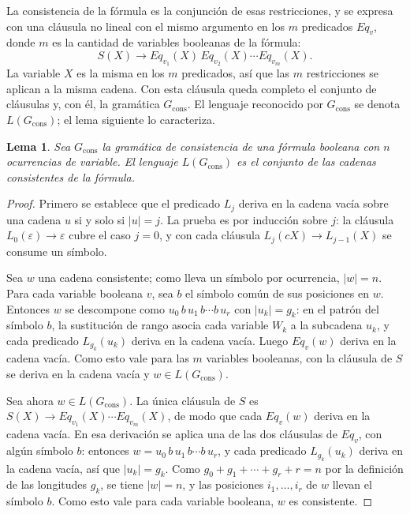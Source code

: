 \documentclass{report}
\theoremstyle{definition}
\theoremstyle{plain}
\newtheorem{lema}{Lema}[chapter]
\theoremstyle{remark}
\begin{document}
La consistencia
de la fórmula es la conjunción de esas restricciones, y se expresa con
una cláusula no lineal con el mismo argumento en los $m$ predicados
$Eq_v$, donde $m$ es la cantidad de variables booleanas de la fórmula:
\[
  S(X) \to Eq_{v_1}(X)\, Eq_{v_2}(X) \cdots Eq_{v_m}(X).
\]
La variable $X$ es la misma en los $m$ predicados, así que las $m$
restricciones se aplican a la misma cadena. Con esta cláusula queda
completo el conjunto de cláusulas y, con él, la gramática
$G_{\mathrm{cons}}$. El lenguaje reconocido por $G_{\mathrm{cons}}$ se
denota $L(G_{\mathrm{cons}})$; el lema siguiente lo caracteriza.

\begin{lema}
  \label{lema:lenguaje-gcons}
  Sea $G_{\mathrm{cons}}$ la gramática de consistencia de una fórmula
  booleana con $n$ ocurrencias de variable. El lenguaje
  $L(G_{\mathrm{cons}})$ es el conjunto de las cadenas consistentes de
  la fórmula.
\end{lema}

\begin{proof}
  Primero se establece que el predicado $L_j$ deriva en la cadena vacía
  sobre una cadena $u$ si y solo si $|u| = j$. La prueba es por
  inducción sobre $j$: la cláusula $L_0(\varepsilon) \to \varepsilon$
  cubre el caso $j = 0$, y con cada cláusula $L_j(cX) \to L_{j-1}(X)$
  se consume un símbolo.

  Sea $w$ una cadena consistente; como lleva un símbolo por ocurrencia,
  $|w| = n$. Para cada variable booleana $v$, sea $b$ el símbolo común
  de sus posiciones en $w$. Entonces $w$ se descompone como
  $u_0\, b\, u_1\, b \cdots b\, u_r$ con $|u_k| = g_k$: en el patrón
  del símbolo $b$, la sustitución de rango asocia cada variable $W_k$ a
  la subcadena $u_k$, y cada predicado $L_{g_k}(u_k)$ deriva en la
  cadena vacía. Luego $Eq_v(w)$ deriva en la cadena vacía. Como esto
  vale para las $m$ variables booleanas, con la cláusula de $S$ se
  deriva en la cadena vacía y $w \in L(G_{\mathrm{cons}})$.

  Sea ahora $w \in L(G_{\mathrm{cons}})$. La única cláusula de $S$ es
  $S(X) \to Eq_{v_1}(X) \cdots Eq_{v_m}(X)$, de modo que cada $Eq_v(w)$
  deriva en la cadena vacía. En esa derivación se aplica una de las dos
  cláusulas de $Eq_v$, con algún símbolo $b$: entonces
  $w = u_0\, b\, u_1\, b \cdots b\, u_r$, y cada predicado
  $L_{g_k}(u_k)$ deriva en la cadena vacía, así que $|u_k| = g_k$. Como
  $g_0 + g_1 + \cdots + g_r + r = n$ por la definición de las
  longitudes $g_k$, se tiene $|w| = n$, y las posiciones
  $i_1, \ldots, i_r$ de $w$ llevan el símbolo $b$. Como esto vale para
  cada variable booleana, $w$ es consistente.
\end{proof}
\end{document}
